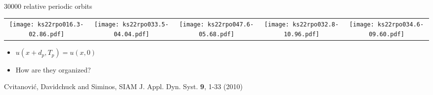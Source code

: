 \begin{frame}{30000 relative periodic orbits}
 \begin{center}
\begin{tabular}{ccccc} 
\texttt{[image: ks22rpo016.3-02.86.pdf]}\hspace{-3ex} &
\texttt{[image: ks22rpo033.5-04.04.pdf]}\hspace{-3ex} &
\texttt{[image: ks22rpo047.6-05.68.pdf]}\hspace{-3ex} &
 \texttt{[image: ks22rpo032.8-10.96.pdf]}\hspace{-3ex} &
 \texttt{[image: ks22rpo034.6-09.60.pdf]}\hspace{-3ex} 
\end{tabular}
\end{center}
\begin{block}{}
  \begin{itemize}
    \item $u(x+d_p,T_p)=u(x,0)$
    \item How are they organized?
  \end{itemize}
\end{block}

\begin{block}{}
 \footnotesize{Cvitanovi\'c, Davidchuck and Siminos, SIAM J. Appl. Dyn. Syst. {\bf 9}, 1-33 (2010)}
\end{block}


\end{frame}


